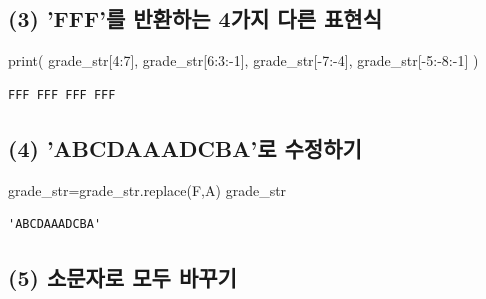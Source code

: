 \documentclass[
  letterpaper,
  DIV=11,
  numbers=noendperiod]{scrreprt}
\newenvironment{Shaded}{\begin{snugshade}}{\end{snugshade}}
\newcommand{\BuiltInTok}[1]{\textcolor[rgb]{0.00,0.23,0.31}{#1}}
\newcommand{\DecValTok}[1]{\textcolor[rgb]{0.68,0.00,0.00}{#1}}
\newcommand{\NormalTok}[1]{\textcolor[rgb]{0.00,0.23,0.31}{#1}}
\newcommand{\OperatorTok}[1]{\textcolor[rgb]{0.37,0.37,0.37}{#1}}
\newcommand{\StringTok}[1]{\textcolor[rgb]{0.13,0.47,0.30}{#1}}
\begin{document}
\subsection*{(3) 'FFF'를 반환하는 4가지 다른
표현식}\label{fffuxb97c-uxbc18uxd658uxd558uxb294-4uxac00uxc9c0-uxb2e4uxb978-uxd45cuxd604uxc2dd}

\begin{Shaded}
\begin{Highlighting}[]
\BuiltInTok{print}\NormalTok{(}
\NormalTok{    grade\_str[}\DecValTok{4}\NormalTok{:}\DecValTok{7}\NormalTok{],}
\NormalTok{    grade\_str[}\DecValTok{6}\NormalTok{:}\DecValTok{3}\NormalTok{:}\OperatorTok{{-}}\DecValTok{1}\NormalTok{],}
\NormalTok{    grade\_str[}\OperatorTok{{-}}\DecValTok{7}\NormalTok{:}\OperatorTok{{-}}\DecValTok{4}\NormalTok{],}
\NormalTok{    grade\_str[}\OperatorTok{{-}}\DecValTok{5}\NormalTok{:}\OperatorTok{{-}}\DecValTok{8}\NormalTok{:}\OperatorTok{{-}}\DecValTok{1}\NormalTok{]}
\NormalTok{)}
\end{Highlighting}
\end{Shaded}

\begin{verbatim}
FFF FFF FFF FFF
\end{verbatim}

\subsection*{(4) 'ABCDAAADCBA'로
수정하기}\label{abcdaaadcbauxb85c-uxc218uxc815uxd558uxae30}

\begin{Shaded}
\begin{Highlighting}[]
\NormalTok{grade\_str}\OperatorTok{=}\NormalTok{grade\_str.replace(}\StringTok{\textquotesingle{}F\textquotesingle{}}\NormalTok{,}\StringTok{\textquotesingle{}A\textquotesingle{}}\NormalTok{)}
\NormalTok{grade\_str}
\end{Highlighting}
\end{Shaded}

\begin{verbatim}
'ABCDAAADCBA'
\end{verbatim}

\subsection*{(5) 소문자로 모두
바꾸기}\label{uxc18cuxbb38uxc790uxb85c-uxbaa8uxb450-uxbc14uxafb8uxae30}
\end{document}
